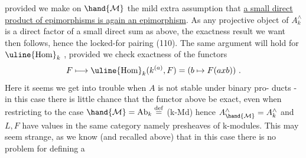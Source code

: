 provided we make on $\hand{\mathcal{M}}$ the mild extra assumption that \uline{a small direct}
\uline{product of epimorphisms is again an epimorphism}. As any projective
object of $A^{\wedge}_k$ is a direct factor of a small direct sum as above, the
exactness result we want then follows, hence the locked-for pairing
(110). The same argument will hold for $\uline{\mathrm{Hom}}_k$ , provided we check
exactness of the functors
\[F \longmapsto \uline{\mathrm{Hom}}_k(k^{(a)},F) = (b \mapsto F(axb)) \ .\]
Here it seems we get into trouble when $A$ is not stable under binary pro-%
ducts - in this case there is little chance that the functor above
be exact, even when restricting to the case $\hand{\mathcal{M}}= \mathrm{Ab}_k \overset{\mathrm{def}}{=}$ (k-Md)\hand{,} hence
$A^{\wedge}_{\hand{\mathcal{M}}} = A^{\wedge}_k$  and $L,F$ have values in the same category \hand{(}namely
 presheaves of k-modules\hand{)}. This may seem strange, as we know (and
recalled above) that in this  case there is no problem for defining a

